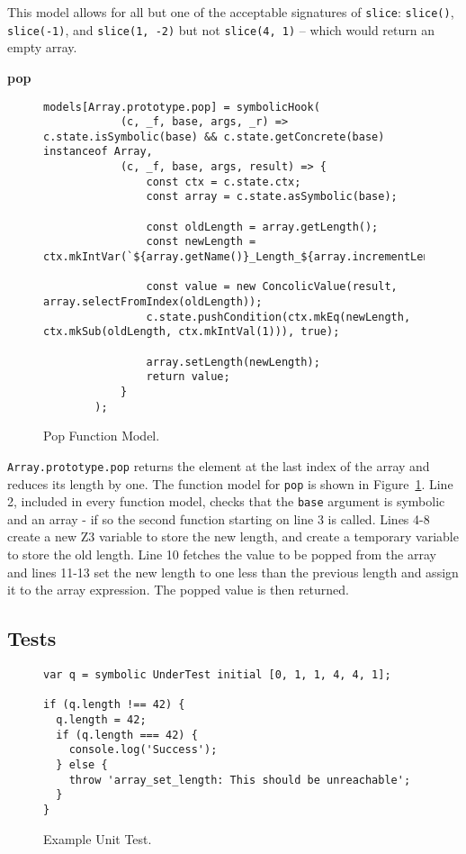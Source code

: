 \documentclass[]{final_report}
\begin{document}
This model allows for all but one of the acceptable signatures of \lstinline|slice|: \lstinline|slice()|, \lstinline|slice(-1)|, and \lstinline|slice(1, -2)| but not \lstinline|slice(4, 1)| -- which would return an empty array.

\textbf{pop}
\begin{figure}[t]
\begin{lstlisting}
models[Array.prototype.pop] = symbolicHook(
            (c, _f, base, args, _r) => c.state.isSymbolic(base) && c.state.getConcrete(base) instanceof Array,
            (c, _f, base, args, result) => {
                const ctx = c.state.ctx;
                const array = c.state.asSymbolic(base);

                const oldLength = array.getLength();
                const newLength = ctx.mkIntVar(`${array.getName()}_Length_${array.incrementLengthCounter()}`);

                const value = new ConcolicValue(result, array.selectFromIndex(oldLength));
                c.state.pushCondition(ctx.mkEq(newLength, ctx.mkSub(oldLength, ctx.mkIntVal(1))), true);
                
                array.setLength(newLength);
                return value;
            }
        );
\end{lstlisting}
\caption{\label{fig:pop-func-model} Pop Function Model.}
\end{figure}

\lstinline|Array.prototype.pop| returns the element at the last index of the array and reduces its length by one. The function model for \lstinline|pop| is shown in Figure~\ref{fig:pop-func-model}. Line 2, included in every function model, checks that the \lstinline|base| argument is symbolic and an array - if so the second function starting on line 3 is called. Lines 4-8 create a new Z3 variable to store the new length, and create a temporary variable to store the old length. Line 10 fetches the value to be popped from the array and lines 11-13 set the new length to one less than the previous length and assign it to the array expression. The popped value is then returned.


\subsection{Tests}
\begin{figure}[t]
\begin{lstlisting}
var q = symbolic UnderTest initial [0, 1, 1, 4, 4, 1];

if (q.length !== 42) {
  q.length = 42;
  if (q.length === 42) {
    console.log('Success');
  } else {
    throw 'array_set_length: This should be unreachable';
  }
}
\end{lstlisting}
\caption{\label{fig:example-length-test} Example Unit Test.}
\end{figure}
\end{document}
